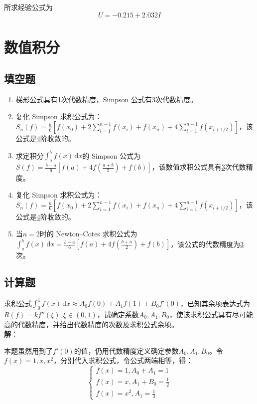 \documentclass[UTF8,a4paper,11pt,oneside]{ctexbook}
\begin{document}
所求经验公式为
\[
U=-0.215+2.032I
\]

\chapter{数值积分}

\section{填空题}
\begin{enumerate}
    \item 梯形公式具有\underline{1}次代数精度，Simpson 公式有\underline{3}次代数精度。
    \item 复化 Simpson 求积公式为：\(S_n(f)=\frac{h}{6}\left[f(x_0)+2\sum\limits_{i=1}^{n-1}f(x_i)+f(x_n)+4\sum\limits_{i=1}^{n-1}f(x_{i+1/2})\right]\)，该公式是\underline{4}阶收敛的。
    \item 求定积分\(\int_a^bf(x)\,\mathrm{d}x\)的 Simpson 公式为\(S(f)=\frac{b-a}{6}\left[f(a)+4f\left(\frac{a+b}{2}\right)+f(b)\right]\)，该数值求积公式具有\underline{3}次代数精度。
    \item 复化 Simpson 求积公式为：\(S_n(f)=\frac{h}{6}\left[f(x_0)+2\sum\limits_{i=1}^{n-1}f(x_i)+f(x_n)+4\sum\limits_{i=1}^{n-1}f(x_{i+1/2})\right]\)，该公式是\underline{4}阶收敛的。
    \item 当\(n=2\)时的 Newton--Cotes 求积公式为\(\int_a^bf(x)\,\mathrm{d}x=\frac{b-a}{6}\left[f(a)+4f\left(\frac{b+a}{2}\right)+f(b)\right]\)，该公式的代数精度为\underline{3}次。
\end{enumerate}

\section{计算题}

求积公式\(\int_0^1f(x)\,\mathrm{d}x\approx A_0f(0)+A_1f(1)+B_0f'(0)\)，已知其余项表达式为\(R(f)=kf''(\xi),\xi\in(0,1)\)，试确定系数\(A_0,A_1,B_0\)，使该求积公式具有尽可能高的代数精度，并给出代数精度的次数及求积公式余项。\\
\textbf{解}：

本题虽然用到了\(f'(0)\)的值，仍用代数精度定义确定参数\(A_0,A_1,B_0\)。令\(f(x)= 1,x,x^2\)，分别代入求积公式，令公式两端相等，得：
\[
\begin{cases}
    f(x)=1,A_0+A_1=1\\
    f(x)=x,A_1+B_0=\frac{1}{2}\\
    f(x)=x^2,A_1=\frac{1}{3}
\end{cases}
\]
\end{document}
